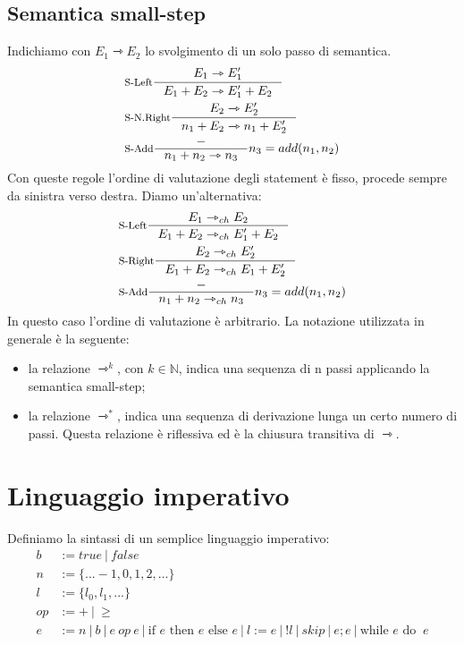 \documentclass[a4paper, 11pt]{article}
\begin{document}
	\subsection{Semantica small-step}
	Indichiamo con $E_1 \rightarrowtriangle E_2$ lo svolgimento di un solo passo di semantica.
	\begin{align*} 
	&\inference[S-Left]{E_1 \rightarrowtriangle E_1'}{E_1 + E_2 \rightarrowtriangle E_1' + E_2} \\
	&\inference[S-N.Right]{E_2 \rightarrowtriangle E_2'}{n_1 + E_2 \rightarrowtriangle n_1 + E_2'} \\
	&\inference[S-Add]{-}{n_1 + n_2 \rightarrowtriangle n_3} n_3 = add(n_1, n_2)
	\end{align*}
	Con queste regole l'ordine di valutazione degli statement è fisso, procede sempre da sinistra verso destra.
	Diamo un'alternativa:
	\begin{align*}
		&\inference[S-Left]{E_1 \rightarrowtriangle_{ch} E_2}{E_1 + E_2 \rightarrowtriangle_{ch} E_1' + E_2} \\
		&\inference[S-Right]{E_2 \rightarrowtriangle_{ch} E_2'}{E_1 + E_2 \rightarrowtriangle_{ch} E_1 + E_2'} \\
		&\inference[S-Add]{-}{n_1 + n_2 \rightarrowtriangle_{ch} n_3} n_3 = add(n_1, n_2)
	\end{align*}
	In questo caso l'ordine di valutazione è arbitrario.
	La notazione utilizzata in generale è la seguente:
	\begin{itemize}
		\item la relazione $\rightarrowtriangle^k$, con $k \in \mathbb{N}$, indica una sequenza di n passi applicando la semantica small-step;
		\item la relazione $\rightarrowtriangle^\ast$, indica una sequenza di derivazione lunga un certo numero di passi. Questa relazione è riflessiva ed è la chiusura transitiva di $\rightarrowtriangle$.
	\end{itemize}

\section{Linguaggio imperativo}
Definiamo la sintassi di un semplice linguaggio imperativo:
\begin{align*}
	b &:= true\ |\ false \\
	n &:= \lbrace ... -1, 0, 1, 2, ...\rbrace\\
	l &:= \lbrace l_0, l_1, ... \rbrace \\
	op &:= +\ |\ \geq \\
	e &:= n\ |\ b\ |\ e\ op\ e\ |\ \text{if } e \text{ then } e \text{ else } e\ |\ l:=e\ |\ !l\ |\ skip\ |\ e;e\ |\ \text{while } e \text{ do }\ e
\end{align*}
\end{document}
